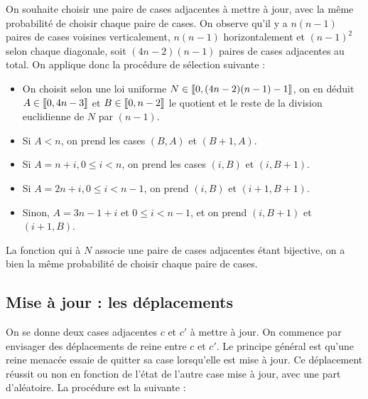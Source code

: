 \documentclass[11pt, openany]{article}
\newcommand{\cg }{[\kern-0.15em [}
\newcommand{\cd}{]\kern-0.15em]}
\begin{document}
On souhaite choisir une paire de cases adjacentes à mettre à jour, avec la même probabilité de choisir chaque paire de cases. On observe qu'il y a $n(n-1)$ paires de cases voisines verticalement, $n(n-1)$ horizontalement et $(n-1)^2$ selon chaque diagonale, soit $(4n-2)(n-1)$ paires de cases adjacentes au total. On applique donc la procédure de sélection suivante : \begin{itemize}

\item{On choisit selon une loi uniforme $N \in \cg 0, (4n-2)(n-1) -1 \cd$, on en déduit $A \in \cg 0, 4n-3 \cd$ et $B \in \cg 0, n-2\cd$ le quotient et le reste de la division euclidienne de $N$ par $(n-1)$.  }
\item{Si $A<n$, on prend les cases $(B,A)$ et $(B+1,A)$.}
\item{Si $A = n+i, 0\leq i<n$, on prend les cases $(i,B)$ et $(i,B+1)$.}
\item{Si $A = 2n+i,0 \leq i<n-1$, on prend $(i,B)$ et $(i+1, B+1)$.}
\item{Sinon, $A = 3n-1+i$ et $0 \leq i<n-1$, et on prend $(i, B+1)$ et $(i+1, B)$.}



\end{itemize}
La fonction qui à $N$ associe une paire de cases adjacentes étant bijective, on a bien la même probabilité de choisir chaque paire de cases. 


\subsection*{Mise à jour : les déplacements}

On se donne deux cases adjacentes $c$ et $c'$ à mettre à jour. On commence par envisager des déplacements de reine entre $c$ et $c'$. Le principe général est qu'une reine menacée essaie de quitter sa case lorsqu'elle est mise à jour. Ce déplacement réussit ou non en fonction de l'état de l'autre case mise à jour, avec une part d'aléatoire. La procédure est la suivante :
\end{document}
